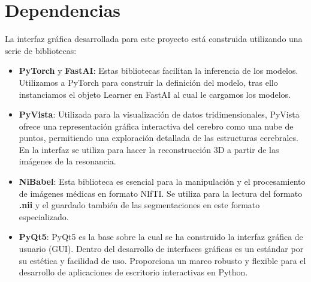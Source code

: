 \section{Dependencias}

La interfaz gráfica desarrollada para este proyecto está construida utilizando una serie de bibliotecas:

\begin{itemize}
	\item \textbf{PyTorch} y \textbf{FastAI}: Estas bibliotecas facilitan la inferencia de los modelos. Utilizamos a PyTorch para construir la definición del modelo, tras ello instanciamos el objeto Learner en FastAI al cual le cargamos los modelos.
	\item \textbf{PyVista}: Utilizada para la visualización de datos tridimensionales, PyVista ofrece una representación gráfica interactiva del cerebro como una nube de puntos, permitiendo una exploración detallada de las estructuras cerebrales. En la interfaz se utiliza para hacer la reconstrucción 3D a partir de las imágenes de la resonancia.
	
	\item \textbf{NiBabel}: Esta biblioteca es esencial para la manipulación y el procesamiento de imágenes médicas en formato NIfTI. Se utiliza para la lectura del formato \textbf{.nii} y el guardado también de las segmentaciones en este formato especializado.
	
	\item \textbf{PyQt5}: PyQt5 es la base sobre la cual se ha construido la interfaz gráfica de usuario (GUI). Dentro del desarrollo de interfaces gráficas es un estándar por su estética y facilidad de uso. Proporciona un marco robusto y flexible para el desarrollo de aplicaciones de escritorio interactivas en Python.
\end{itemize}
